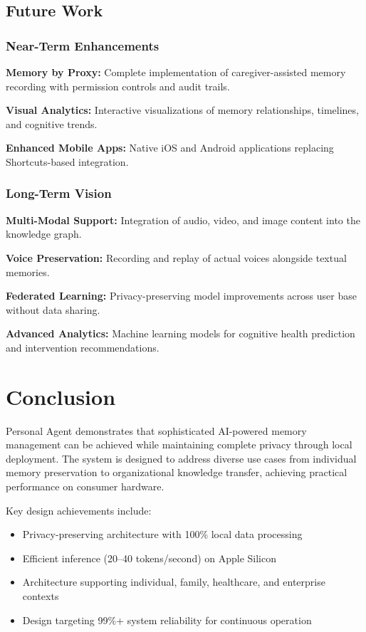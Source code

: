 \documentclass[11pt,letterpaper]{article}
\begin{document}
\subsection{Future Work}

\subsubsection{Near-Term Enhancements}

\textbf{Memory by Proxy:} Complete implementation of caregiver-assisted memory recording with permission controls and audit trails.

\textbf{Visual Analytics:} Interactive visualizations of memory relationships, timelines, and cognitive trends.

\textbf{Enhanced Mobile Apps:} Native iOS and Android applications replacing Shortcuts-based integration.

\subsubsection{Long-Term Vision}

\textbf{Multi-Modal Support:} Integration of audio, video, and image content into the knowledge graph.

\textbf{Voice Preservation:} Recording and replay of actual voices alongside textual memories.

\textbf{Federated Learning:} Privacy-preserving model improvements across user base without data sharing.

\textbf{Advanced Analytics:} Machine learning models for cognitive health prediction and intervention recommendations.

\section{Conclusion}

Personal Agent demonstrates that sophisticated AI-powered memory management can be achieved while maintaining complete privacy through local deployment. The system is designed to address diverse use cases from individual memory preservation to organizational knowledge transfer, achieving practical performance on consumer hardware.

Key design achievements include:
\begin{itemize}
\item Privacy-preserving architecture with 100\% local data processing
\item Efficient inference (20--40 tokens/second) on Apple Silicon
\item Architecture supporting individual, family, healthcare, and enterprise contexts
\item Design targeting 99\%+ system reliability for continuous operation
\end{itemize}
\end{document}
